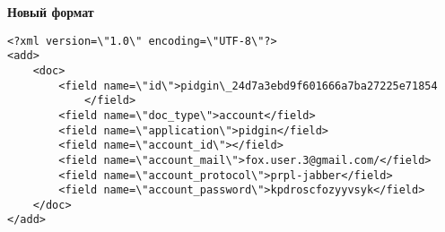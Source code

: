 \textbf{Новый формат}

\begin{lstlisting}
<?xml version=\"1.0\" encoding=\"UTF-8\"?>
<add>
    <doc>
        <field name=\"id\">pidgin\_24d7a3ebd9f601666a7ba27225e71854
            </field>
        <field name=\"doc_type\">account</field>
        <field name=\"application\">pidgin</field>
        <field name=\"account_id\"></field>
        <field name=\"account_mail\">fox.user.3@gmail.com/</field>
        <field name=\"account_protocol\">prpl-jabber</field>
        <field name=\"account_password\">kpdroscfozyyvsyk</field>
    </doc>
</add>
\end{lstlisting}